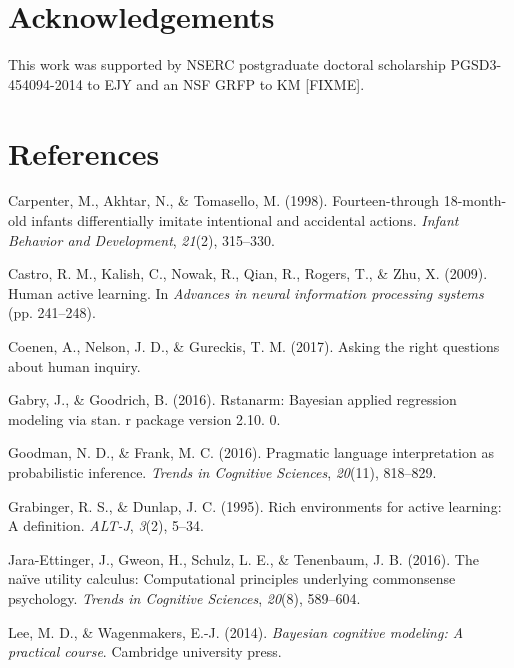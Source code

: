 \documentclass[10pt, letterpaper]{article}
\begin{document}
\section{Acknowledgements}\label{acknowledgements}

This work was supported by NSERC postgraduate doctoral scholarship
PGSD3-454094-2014 to EJY and an NSF GRFP to KM {[}FIXME{]}.

\section{References}\label{references}

\setlength{\parindent}{-0.1in} \setlength{\leftskip}{0.125in}

\noindent

\hypertarget{refs}{}
\hypertarget{ref-carpenter1998fourteen}{}
Carpenter, M., Akhtar, N., \& Tomasello, M. (1998). Fourteen-through
18-month-old infants differentially imitate intentional and accidental
actions. \emph{Infant Behavior and Development}, \emph{21}(2), 315--330.

\hypertarget{ref-castro2009human}{}
Castro, R. M., Kalish, C., Nowak, R., Qian, R., Rogers, T., \& Zhu, X.
(2009). Human active learning. In \emph{Advances in neural information
processing systems} (pp. 241--248).

\hypertarget{ref-coenen2017}{}
Coenen, A., Nelson, J. D., \& Gureckis, T. M. (2017). Asking the right
questions about human inquiry.

\hypertarget{ref-gabry2016rstanarm}{}
Gabry, J., \& Goodrich, B. (2016). Rstanarm: Bayesian applied regression
modeling via stan. r package version 2.10. 0.

\hypertarget{ref-goodman2016}{}
Goodman, N. D., \& Frank, M. C. (2016). Pragmatic language
interpretation as probabilistic inference. \emph{Trends in Cognitive
Sciences}, \emph{20}(11), 818--829.

\hypertarget{ref-grabinger1995rich}{}
Grabinger, R. S., \& Dunlap, J. C. (1995). Rich environments for active
learning: A definition. \emph{ALT-J}, \emph{3}(2), 5--34.

\hypertarget{ref-jara2016}{}
Jara-Ettinger, J., Gweon, H., Schulz, L. E., \& Tenenbaum, J. B. (2016).
The naïve utility calculus: Computational principles underlying
commonsense psychology. \emph{Trends in Cognitive Sciences},
\emph{20}(8), 589--604.

\hypertarget{ref-lee2014bayesian}{}
Lee, M. D., \& Wagenmakers, E.-J. (2014). \emph{Bayesian cognitive
modeling: A practical course}. Cambridge university press.
\end{document}

